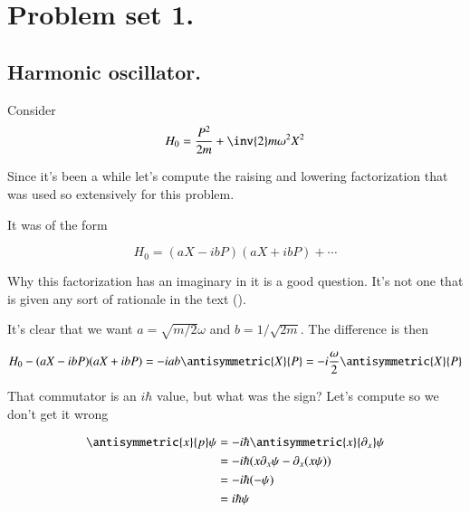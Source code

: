 %
%

\chapter{Problem set 1.}
\label{chap:phy456ps1}
{}
\date{Sept 12, 2011}

\beginArtWithToc

\section{Harmonic oscillator.}

Consider
\begin{equation}\label{eqn:phy456ps1:10}
H_0 = \frac{P^2}{2m} + \inv{2} m \omega^2 X^2
\end{equation}

Since it's been a while let's compute the raising and lowering factorization that was used so extensively for this problem.

It was of the form

\begin{equation}\label{eqn:phy456ps1:30}
H_0 = (a X - i b P)(a X + i b P) + \cdots
\end{equation}

Why this factorization has an imaginary in it is a good question.  It's not one that is given any sort of rationale in the text (\cite{desai2009quantum}).

It's clear that we want $a = \sqrt{m/2} \omega$ and $b = 1/\sqrt{2m}$.  The difference is then

\begin{equation}\label{eqn:phy456ps1:50}
H_0 - (a X - i b P)(a X + i b P)
=
- i a b \antisymmetric{X}{P}  = - i \frac{\omega}{2} \antisymmetric{X}{P}
\end{equation}

That commutator is an $i\hbar$ value, but what was the sign?  Let's compute so we don't get it wrong

\begin{align*}
\antisymmetric{x}{ p} \psi
&= -i \hbar \antisymmetric{x}{\partial_x} \psi \\
&= -i \hbar ( x \partial_x \psi - \partial_x (x \psi) ) \\
&= -i \hbar ( - \psi ) \\
&= i \hbar \psi
\end{align*}


